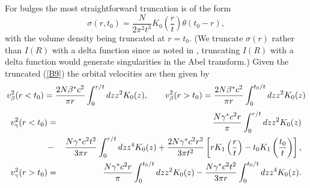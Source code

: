 \documentclass[preprint,aps]{revtex4}
\begin{document}
For bulges the most straightforward truncation is of the form 
%
\begin{equation}
\sigma(r,t_0)=\frac{N}{2\pi^2 t^3}K_0\left(\frac{r}{t}\right)\theta(t_0-r),
\label{B9}
\end{equation}
%
with the volume density being truncated at $r=t_0$. (We truncate $\sigma(r)$ rather than $I(R)$ with a delta function since as noted in \cite{Mannheim1996}, truncating $I(R)$ with a delta function would generate singularities in the Abel transform.) Given the truncated (\ref{B9}) the orbital velocities are then  given by
% 
\begin{equation}
v^2_{\beta}(r<t_0)={2 N\beta^* c^2\over \pi r} \int_0^{r/t}dz z^2K_0(z),\qquad
v^2_{\beta}(r>t_0)={2 N\beta^* c^2\over \pi r} \int_0^{t_0/t}dz z^2K_0(z)
\label{B10}
\end{equation} 
% 
% 
\begin{eqnarray}
v^2_{\gamma}(r<t_0)&=&{N\gamma^* c^2 r\over \pi} \int_0^{r/t}dz z^2K_0(z)
\nonumber\\
&-&{ N\gamma^* c^2 t^2 \over 3 \pi r} \int_0^{r/t}dz z^4K_0(z)
+{2 N\gamma^* c^2 r^2 \over 3\pi t^2}\left[rK_1\left(\frac{r}{t}\right)-t_0K_1\left(\frac{t_0}{t}\right)\right],
\nonumber\\
v^2_{\gamma}(r>t_0)&=&{N\gamma^* c^2 r\over \pi} \int_0^{t_0/t}dz z^2K_0(z)
-{N\gamma^* c^2 t^2 \over 3 \pi r} \int_0^{t_0/t}dz z^4K_0(z).
\label{B11}
\end{eqnarray} 
%
\end{document}
